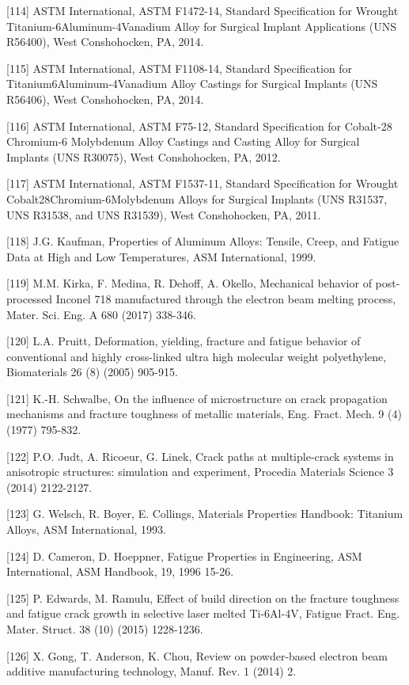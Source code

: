 \documentclass[10pt]{article}
\begin{document}
[114] ASTM International, ASTM F1472-14, Standard Specification for Wrought Titanium-6Aluminum-4Vanadium Alloy for Surgical Implant Applications (UNS R56400), West Conshohocken, PA, 2014.

[115] ASTM International, ASTM F1108-14, Standard Specification for Titanium6Aluminum-4Vanadium Alloy Castings for Surgical Implants (UNS R56406), West Conshohocken, PA, 2014.

[116] ASTM International, ASTM F75-12, Standard Specification for Cobalt-28 Chromium-6 Molybdenum Alloy Castings and Casting Alloy for Surgical Implants (UNS R30075), West Conshohocken, PA, 2012.

[117] ASTM International, ASTM F1537-11, Standard Specification for Wrought Cobalt28Chromium-6Molybdenum Alloys for Surgical Implants (UNS R31537, UNS R31538, and UNS R31539), West Conshohocken, PA, 2011.

[118] J.G. Kaufman, Properties of Aluminum Alloys: Tensile, Creep, and Fatigue Data at High and Low Temperatures, ASM International, 1999.

[119] M.M. Kirka, F. Medina, R. Dehoff, A. Okello, Mechanical behavior of post-processed Inconel 718 manufactured through the electron beam melting process, Mater. Sci. Eng. A 680 (2017) 338-346.

[120] L.A. Pruitt, Deformation, yielding, fracture and fatigue behavior of conventional and highly cross-linked ultra high molecular weight polyethylene, Biomaterials 26 (8) (2005) 905-915.

[121] K.-H. Schwalbe, On the influence of microstructure on crack propagation mechanisms and fracture toughness of metallic materials, Eng. Fract. Mech. 9 (4) (1977) 795-832.

[122] P.O. Judt, A. Ricoeur, G. Linek, Crack paths at multiple-crack systems in anisotropic structures: simulation and experiment, Procedia Materials Science 3 (2014) 2122-2127.

[123] G. Welsch, R. Boyer, E. Collings, Materials Properties Handbook: Titanium Alloys, ASM International, 1993.

[124] D. Cameron, D. Hoeppner, Fatigue Properties in Engineering, ASM International, ASM Handbook, 19, 1996 15-26.

[125] P. Edwards, M. Ramulu, Effect of build direction on the fracture toughness and fatigue crack growth in selective laser melted Ti-6Al-4V, Fatigue Fract. Eng. Mater. Struct. 38 (10) (2015) 1228-1236.

[126] X. Gong, T. Anderson, K. Chou, Review on powder-based electron beam additive manufacturing technology, Manuf. Rev. 1 (2014) 2.
\end{document}
